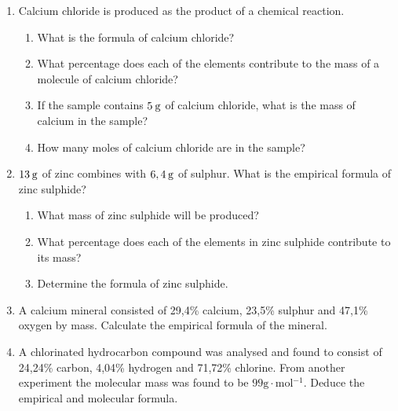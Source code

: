       \label{m38712*id281924}\begin{enumerate}[noitemsep, label=\textbf{\arabic*}. ] 
            \label{m38712*uid73}\item Calcium chloride is produced as the product of a chemical reaction.
\label{m38712*id281940}\begin{enumerate}[noitemsep, label=\textbf{\alph*}. ] 
            \label{m38712*uid74}\item What is the formula of calcium chloride?
\label{m38712*uid75}\item What percentage does each of the elements contribute to the mass of a molecule of calcium chloride?
\label{m38712*uid76}\item If the sample contains \begin{math}5\phantom{\rule{2pt}{0ex}}\mathrm{g}\end{math} of calcium chloride, what is the mass of calcium in the sample?
\label{m38712*uid77}\item How many moles of calcium chloride are in the sample?
\end{enumerate}
                \label{m38712*uid78}\item \begin{math}13\phantom{\rule{2pt}{0ex}}\mathrm{g}\end{math} of zinc combines with \begin{math}6,4\phantom{\rule{2pt}{0ex}}\mathrm{g}\end{math} of sulphur. What is the empirical formula of zinc sulphide?
\label{m38712*id282007}\begin{enumerate}[noitemsep, label=\textbf{\alph*}. ] 
            \label{m38712*uid79}\item What mass of zinc sulphide will be produced?
\label{m38712*uid80}\item What percentage does each of the elements in zinc sulphide contribute to its mass?
\label{m38712*uid81}\item Determine the formula of zinc sulphide.
\end{enumerate}
                \label{m38712*uid82}\item A calcium mineral consisted of 29,4\% calcium, 23,5\% sulphur and 47,1\% oxygen by mass. Calculate the empirical formula of the mineral.\newline
            
\label{m38712*uid83}\item A chlorinated hydrocarbon compound was analysed and found to consist of 24,24\% carbon, 4,04\% hydrogen and 71,72\% chlorine. From another experiment the molecular mass was found to be \begin{math}99\mathrm{g}\ensuremath{\cdot}\mathrm{mol}{}^{-1}\end{math}. Deduce the empirical and molecular formula.\newline
            
\end{enumerate}
        
